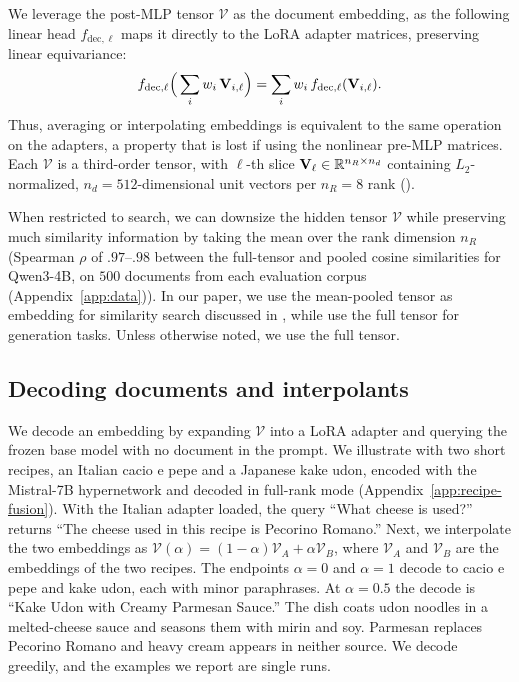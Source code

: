 We leverage the post-MLP tensor $\mathcal{V}$ as the document embedding, as the following linear head $f_{\mathrm{dec},\ell}$ maps it directly to the LoRA adapter matrices, preserving linear equivariance:
\begin{equation}
f_{\mathrm{dec},\ell}\Big(\sum_i w_i\, {\mathbf{V}}_{i,\ell}\Big) = \sum_i w_i\, f_{\mathrm{dec},\ell}({\mathbf{V}}_{i,\ell}).
\label{eq:linearity}
\end{equation}
Thus, averaging or interpolating embeddings is equivalent to the same operation on the adapters, a property that is lost if using the nonlinear pre-MLP matrices. Each $\mathcal{V}$ is a third-order tensor, with $\ell$-th slice ${\mathbf{V}}_{\ell} \in \mathbb{R}^{n_R \times n_d}$ containing $L_2$-normalized, $n_d{=}512$-dimensional unit vectors per $n_R{=}8$ rank ().

When restricted to search, we can downsize the hidden tensor $\mathcal{V}$ while preserving much similarity information by taking the mean over the rank dimension $n_R$ (Spearman $\rho$ of $.97$--$.98$ between the full-tensor and pooled cosine similarities for Qwen3-4B, on $500$ documents from each evaluation corpus (Appendix~\ref{app:data})).
In our paper, we use the mean-pooled tensor as embedding for similarity search discussed in , while use the full tensor for generation tasks. Unless otherwise noted, we use the full tensor.

\subsection{Decoding documents and interpolants}
\label{sec:decode}

We decode an embedding by expanding $\mathcal{V}$ into a LoRA adapter and querying the frozen base model with no document in the prompt.
We illustrate with two short recipes, an Italian cacio e pepe and a Japanese kake udon, encoded with the Mistral-7B hypernetwork and decoded in full-rank mode (Appendix~\ref{app:recipe-fusion}).
With the Italian adapter loaded, the query ``What cheese is used?'' returns ``The cheese used in this recipe is Pecorino Romano.''
Next, we interpolate the two embeddings as $\mathcal{V}(\alpha)=(1-\alpha)\mathcal{V}_A+\alpha\mathcal{V}_B$, where $\mathcal{V}_A$ and $\mathcal{V}_B$ are the embeddings of the two recipes.
The endpoints $\alpha=0$ and $\alpha=1$ decode to cacio e pepe and kake udon, each with minor paraphrases.
At $\alpha=0.5$ the decode is ``Kake Udon with Creamy Parmesan Sauce.''
The dish coats udon noodles in a melted-cheese sauce and seasons them with mirin and soy.
Parmesan replaces Pecorino Romano and heavy cream appears in neither source.
We decode greedily, and the examples we report are single runs. 

